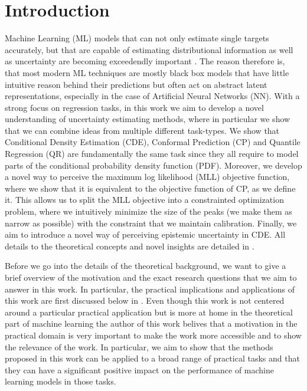 
\chapter{Introduction}\label{chap:introduction}

Machine Learning (ML) models that can not only estimate single targets accurately, but that are capable of estimating distributional information as well as uncertainty are becoming exceedendly important \cite{hullermeier_aleatoric_2021, gawlikowski2023survey}. The reason therefore is, that most modern ML techniques are mostly black box models that have little intuitive reason behind their predictions but often act on abstract latent representations, especially in the case of Artificial Neural Networks (NN). With a strong focus on regression tasks, in this work we aim to develop a novel understanding of uncertainty estimating methods, where in particular we show that we can combine ideas from multiple different task-types. We show that Conditional Density Estimation (CDE), Conformal Prediction (CP) and Quantile Regression (QR) are fundamentally the same task since they all require to model parts of the conditional probability density function (PDF). Moreover, we develop a novel way to perceive the maximum log likelihood (MLL) objective function, where we show that it is equivalent to the objective function of CP, as we define it. This allows us to split the MLL objective into a constrainted optimization problem, where we intuitively minimize the size of the peaks (we make them as narrow as possible) with the constraint that we maintain calibration. Finally, we aim to introduce a novel way of perceiving epistemic uncertainty in CDE. All details to the theoretical concepts and novel insights are detailed in .

Before we go into the details of the theoretical background, we want to give a brief overview of the motivation and the exact research questions that we aim to answer in this work. In particular, the practical implications and applications of this work are first discussed below in . Even though this work is not centered around a particular practical application but is more at home in the theoretical part of machine learning the author of this work belives that a motivation in the practical domain is very important to make the work more accessible and to show the relevance of the work. In particular, we aim to show that the methods proposed in this work can be applied to a broad range of practical tasks and that they can have a significant positive impact on the performance of machine learning models in those tasks.

